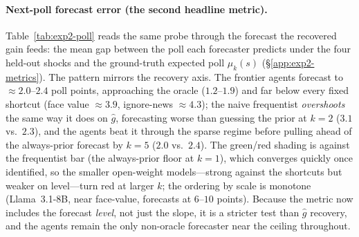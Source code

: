 \paragraph{Next-poll forecast error (the second headline metric).}  Table~\ref{tab:exp2-poll} reads
the same probe through the forecast the recovered gain feeds: the mean gap between the poll each
forecaster predicts under the four held-out shocks and the ground-truth expected poll $\mu_k(s)$
(\S\ref{app:exp2-metrics}).  The pattern mirrors the recovery axis.  The frontier agents forecast to
$\approx2.0$--$2.4$ poll points, approaching the oracle ($1.2$--$1.9$) and far below every fixed
shortcut (face value $\approx3.9$, ignore-news $\approx4.3$); the naive frequentist \emph{overshoots}
the same way it does on $\hat g$, forecasting worse than guessing the prior at $k{=}2$ ($3.1$ vs.\
$2.3$), and the agents beat it through the sparse regime before pulling ahead of the always-prior
forecast by $k{=}5$ ($2.0$ vs.\ $2.4$).  The green/red shading is against the frequentist bar (the
always-prior floor at $k{=}1$), which converges quickly once identified, so the smaller open-weight
models---strong against the shortcuts but weaker on level---turn red at larger $k$; the ordering by
scale is monotone (Llama~3.1-8B, near face-value, forecasts at $6$--$10$ points).  Because the metric
now includes the forecast \emph{level}, not just the slope, it is a stricter test than $\hat g$
recovery, and the agents remain the only non-oracle forecaster near the ceiling throughout.

